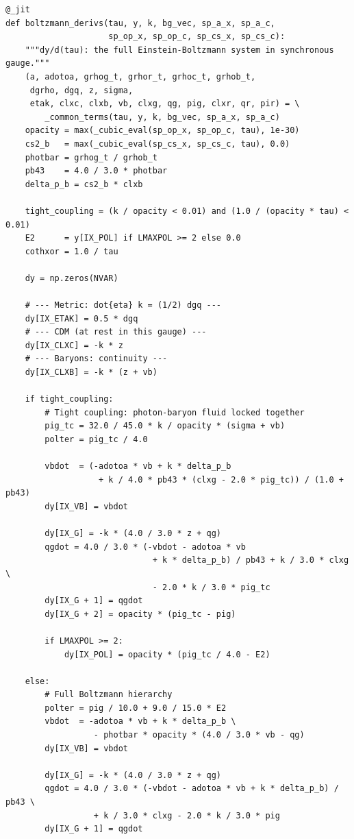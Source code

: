 \begin{codebox}
\begin{lstlisting}[style=python]
@_jit
def boltzmann_derivs(tau, y, k, bg_vec, sp_a_x, sp_a_c,
                     sp_op_x, sp_op_c, sp_cs_x, sp_cs_c):
    """dy/d(tau): the full Einstein-Boltzmann system in synchronous gauge."""
    (a, adotoa, grhog_t, grhor_t, grhoc_t, grhob_t,
     dgrho, dgq, z, sigma,
     etak, clxc, clxb, vb, clxg, qg, pig, clxr, qr, pir) = \
        _common_terms(tau, y, k, bg_vec, sp_a_x, sp_a_c)
    opacity = max(_cubic_eval(sp_op_x, sp_op_c, tau), 1e-30)
    cs2_b   = max(_cubic_eval(sp_cs_x, sp_cs_c, tau), 0.0)
    photbar = grhog_t / grhob_t
    pb43    = 4.0 / 3.0 * photbar
    delta_p_b = cs2_b * clxb

    tight_coupling = (k / opacity < 0.01) and (1.0 / (opacity * tau) < 0.01)
    E2      = y[IX_POL] if LMAXPOL >= 2 else 0.0
    cothxor = 1.0 / tau

    dy = np.zeros(NVAR)

    # --- Metric: dot{eta} k = (1/2) dgq ---
    dy[IX_ETAK] = 0.5 * dgq
    # --- CDM (at rest in this gauge) ---
    dy[IX_CLXC] = -k * z
    # --- Baryons: continuity ---
    dy[IX_CLXB] = -k * (z + vb)

    if tight_coupling:
        # Tight coupling: photon-baryon fluid locked together
        pig_tc = 32.0 / 45.0 * k / opacity * (sigma + vb)
        polter = pig_tc / 4.0

        vbdot  = (-adotoa * vb + k * delta_p_b
                   + k / 4.0 * pb43 * (clxg - 2.0 * pig_tc)) / (1.0 + pb43)
        dy[IX_VB] = vbdot

        dy[IX_G] = -k * (4.0 / 3.0 * z + qg)
        qgdot = 4.0 / 3.0 * (-vbdot - adotoa * vb
                              + k * delta_p_b) / pb43 + k / 3.0 * clxg \
                              - 2.0 * k / 3.0 * pig_tc
        dy[IX_G + 1] = qgdot
        dy[IX_G + 2] = opacity * (pig_tc - pig)

        if LMAXPOL >= 2:
            dy[IX_POL] = opacity * (pig_tc / 4.0 - E2)

    else:
        # Full Boltzmann hierarchy
        polter = pig / 10.0 + 9.0 / 15.0 * E2
        vbdot  = -adotoa * vb + k * delta_p_b \
                  - photbar * opacity * (4.0 / 3.0 * vb - qg)
        dy[IX_VB] = vbdot

        dy[IX_G] = -k * (4.0 / 3.0 * z + qg)
        qgdot = 4.0 / 3.0 * (-vbdot - adotoa * vb + k * delta_p_b) / pb43 \
                  + k / 3.0 * clxg - 2.0 * k / 3.0 * pig
        dy[IX_G + 1] = qgdot


\end{lstlisting}
\end{codebox}
